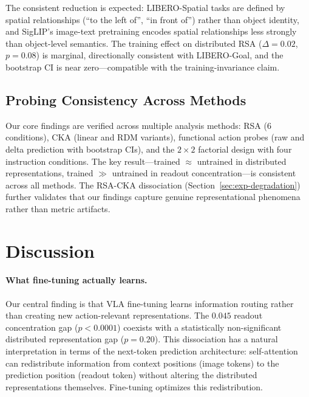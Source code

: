 \documentclass[letterpaper]{article}
\begin{document}
The consistent reduction is expected: LIBERO-Spatial tasks are defined by spatial relationships (``to the left of'', ``in front of'') rather than object identity, and SigLIP's image-text pretraining encodes spatial relationships less strongly than object-level semantics.
The training effect on distributed RSA ($\Delta{=}0.02$, $p{=}0.08$) is marginal, directionally consistent with LIBERO-Goal, and the bootstrap CI is near zero---compatible with the training-invariance claim.

\subsection{Probing Consistency Across Methods}
\label{sec:exp-consistency}

Our core findings are verified across multiple analysis methods: RSA (6 conditions), CKA (linear and RDM variants), functional action probes (raw and delta prediction with bootstrap CIs), and the $2{\times}2$ factorial design with four instruction conditions.
The key result---trained $\approx$ untrained in distributed representations, trained $\gg$ untrained in readout concentration---is consistent across all methods.
The RSA-CKA dissociation (Section~\ref{sec:exp-degradation}) further validates that our findings capture genuine representational phenomena rather than metric artifacts.


\section{Discussion}

\paragraph{What fine-tuning actually learns.}
Our central finding is that VLA fine-tuning learns information routing rather than creating new action-relevant representations.
The $0.045$ readout concentration gap ($p{<}0.0001$) coexists with a statistically non-significant distributed representation gap ($p{=}0.20$).
This dissociation has a natural interpretation in terms of the next-token prediction architecture: self-attention can redistribute information from context positions (image tokens) to the prediction position (readout token) without altering the distributed representations themselves.
Fine-tuning optimizes this redistribution.
\end{document}
